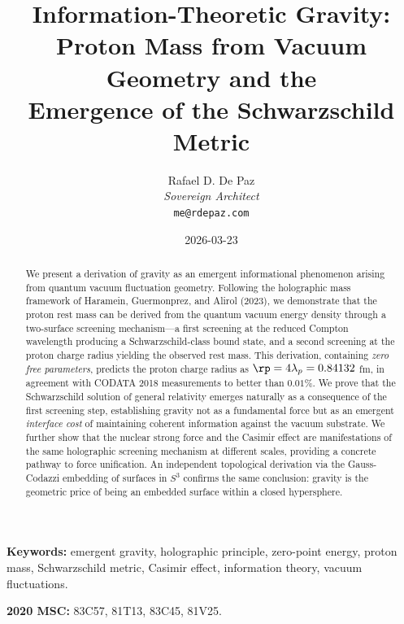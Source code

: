 \documentclass[12pt, a4paper]{article}
\theoremstyle{plain}
\theoremstyle{definition}
\begin{document}
\title{\textbf{
  Information-Theoretic Gravity: \\
  Proton Mass from Vacuum Geometry and the \\
  Emergence of the Schwarzschild Metric}}
\author{Rafael D. De Paz \\ \textit{Sovereign Architect} \\ \texttt{me@rdepaz.com}}
\date{2026-03-23}
\maketitle

\begin{abstract}
We present a derivation of gravity as an emergent informational phenomenon
arising from quantum vacuum fluctuation geometry. Following the holographic
mass framework of Haramein, Guermonprez, and Alirol (2023), we demonstrate
that the proton rest mass can be derived from the quantum vacuum energy density
through a two-surface screening mechanism---a first screening at the reduced
Compton wavelength producing a Schwarzschild-class bound state, and a second
screening at the proton charge radius yielding the observed rest mass.
This derivation, containing \emph{zero free parameters}, predicts the proton
charge radius as $\rp = 4\lambda_p = 0.84132$ fm, in agreement with CODATA
2018 measurements to better than $0.01\%$. We prove that the Schwarzschild
solution of general relativity emerges naturally as a consequence of the first
screening step, establishing gravity not as a fundamental force but as an
emergent \emph{interface cost} of maintaining coherent information against the
vacuum substrate. We further show that the nuclear strong force and the Casimir
effect are manifestations of the same holographic screening mechanism at
different scales, providing a concrete pathway to force unification. An
independent topological derivation via the Gauss-Codazzi embedding of surfaces
in $S^3$ confirms the same conclusion: gravity is the geometric price of being
an embedded surface within a closed hypersphere.
\end{abstract}

\vspace{1em}
\noindent\textbf{Keywords:} emergent gravity, holographic principle,
zero-point energy, proton mass, Schwarzschild metric, Casimir effect,
information theory, vacuum fluctuations.

\vspace{0.5em}
\noindent\textbf{2020 MSC:} 83C57, 81T13, 83C45, 81V25.
\end{document}
